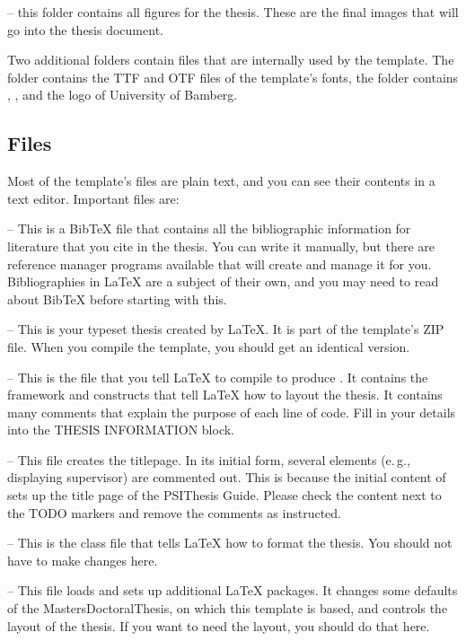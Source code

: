 -- this folder contains all figures for the thesis. These are the final images that will go into the thesis document.

Two additional folders contain files that are internally used by the template. The folder  contains the TTF and OTF files of the template's fonts, the folder  contains , , and the logo of University of Bamberg.

\subsection{Files}
\label{sec:files}

Most of the template's files are plain text, and you can see their contents in a text editor. Important files are:

 -- This is a BibTeX file that contains all the bibliographic information for literature that you cite in the thesis.
You can write it manually, but there are reference manager programs available that will create and manage it for you. Bibliographies in LaTeX are a subject of their own, and you may need to read about BibTeX before starting with this.

 -- This is your typeset thesis created by LaTeX. It is part of the template's ZIP file. When you compile the template, you should get an identical version.

 -- This is the file that you tell LaTeX to compile to produce .
It contains the framework and constructs that tell LaTeX how to layout the thesis. It contains many comments that explain the purpose of each line of code. Fill in your details into the THESIS INFORMATION block.

 -- This file creates the titlepage. In its initial form, several elements (e.\,g., displaying supervisor) are commented out.
This is because the initial content of  sets up the title page of the PSIThesis Guide. Please check the content next to the TODO markers and remove the comments as instructed.

 -- This is the class file that tells LaTeX how to format the thesis. You should not have to make changes here.

 -- This file loads and sets up additional LaTeX packages.
It changes some defaults of the MastersDoctoralThesis, on which this template is based, and controls the layout of the thesis. If you want to need the layout, you should do that here.

